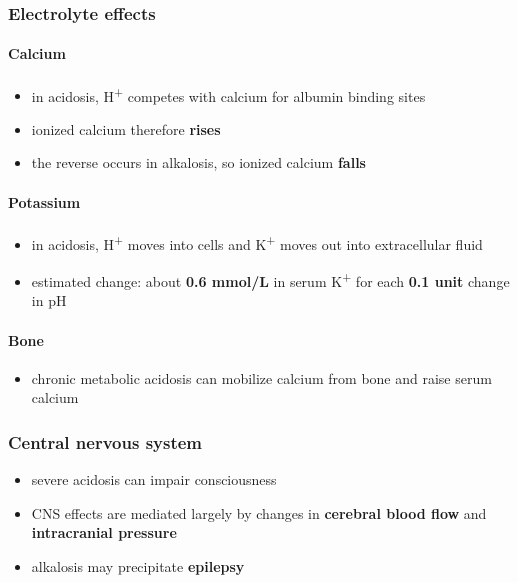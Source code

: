 \documentclass[11pt,a4paper]{article}
\begin{document}
\subsubsection{Electrolyte effects}

\paragraph{Calcium}
\begin{itemize}
  \item in acidosis, H\textsuperscript{+} competes with calcium for albumin binding sites
  \item ionized calcium therefore \textbf{rises}
  \item the reverse occurs in alkalosis, so ionized calcium \textbf{falls}
\end{itemize}

\paragraph{Potassium}
\begin{itemize}
  \item in acidosis, H\textsuperscript{+} moves into cells and K\textsuperscript{+} moves out into extracellular fluid
  \item estimated change: about \textbf{0.6 mmol/L} in serum K\textsuperscript{+} for each \textbf{0.1 unit} change in pH
\end{itemize}

\paragraph{Bone}
\begin{itemize}
  \item chronic metabolic acidosis can mobilize calcium from bone and raise serum calcium
\end{itemize}

\subsubsection{Central nervous system}

\begin{itemize}
  \item severe acidosis can impair consciousness
  \item CNS effects are mediated largely by changes in \textbf{cerebral blood flow} and \textbf{intracranial pressure}
  \item alkalosis may precipitate \textbf{epilepsy}
\end{itemize}
\end{document}
